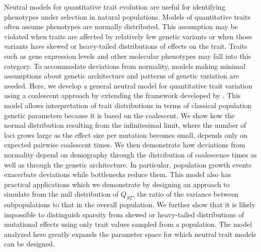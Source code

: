 Neutral models for quantitative trait evolution are useful for identifying
phenotypes under selection in natural populations. Models of quantitative traits
often assume phenotypes are normally distributed. This assumption may be
violated when traits are affected by relatively few genetic variants or when
those variants have skewed or heavy-tailed distributions of effects on the trait.
Traits such as gene expression levels and other molecular phenotypes may fall
into this category. To accommodate deviations from normality, models making
minimal assumptions about genetic architecture and patterns of genetic variation
are needed. Here, we develop a general neutral model for quantitative trait
variation using a coalescent approach by extending the framework developed
by \citet{Schraiber2015}. This model allows interpretation of trait
distributions in terms of classical population genetic parameters because it is
based on the coalescent. We show how the normal distribution resulting from the
infinitesimal limit, where the number of loci grows large as the effect size per
mutation becomes small, depends only on expected pairwise coalescent times. We
then demonstrate how deviations from normality depend on demography through the
distribution of coalescence times as well as through the genetic architecture.
In particular, population growth events exacerbate deviations while bottlenecks
reduce them. This model also has practical applications which we demonstrate by
designing an approach to simulate from the null distribution of $Q_{ST}$, the
ratio of the variance between subpopulations to that in the overall population.
We further show that it is likely impossible to distinguish sparsity from skewed
or heavy-tailed distributions of mutational effects using only trait values
sampled from a population. The model analyzed here greatly expands the parameter
space for which neutral trait models can be designed.

